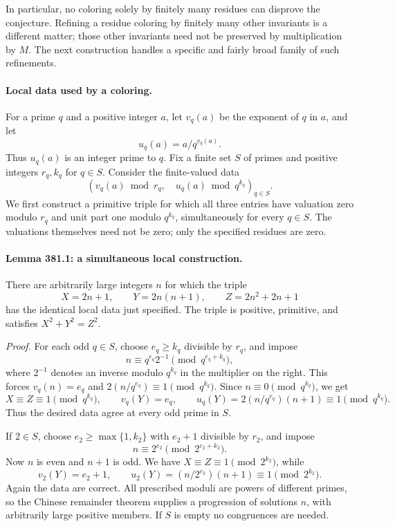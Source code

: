 \documentclass[11pt]{article}
\begin{document}
In particular, no coloring solely by finitely many residues can disprove the conjecture. Refining a residue coloring by finitely many other invariants is a different matter; those other invariants need not be preserved by multiplication by $M$. The next construction handles a specific and fairly broad family of such refinements.

\paragraph{Local data used by a coloring.}
For a prime $q$ and a positive integer $a$, let $v_q(a)$ be the exponent of $q$ in $a$, and let
\[
                        u_q(a)=a/q^{v_q(a)}.
\]
Thus $u_q(a)$ is an integer prime to $q$. Fix a finite set $S$ of primes and positive integers $r_q,k_q$ for $q\in S$. Consider the finite-valued data
\begin{equation}\label{a381:localdata}
 \left(v_q(a)\bmod r_q,\quad u_q(a)\bmod q^{k_q}\right)_{q\in S}.
\end{equation}
We first construct a primitive triple for which all three entries have valuation zero modulo $r_q$ and unit part one modulo $q^{k_q}$, simultaneously for every $q\in S$. The valuations themselves need not be zero; only the specified residues are zero.

\paragraph{Lemma 381.1: a simultaneous local construction.}
There are arbitrarily large integers $n$ for which the triple
\begin{equation}\label{a381:consecutive}
        X=2n+1,\qquad Y=2n(n+1),\qquad Z=2n^2+2n+1
\end{equation}
has the identical local data just specified. The triple is positive, primitive, and satisfies $X^2+Y^2=Z^2$.

\emph{Proof.} For each odd $q\in S$, choose $e_q\geq k_q$ divisible by $r_q$, and impose
\[
                  n\equiv q^{e_q}2^{-1}\pmod{q^{e_q+k_q}},
\]
where $2^{-1}$ denotes an inverse modulo $q^{k_q}$ in the multiplier on the right. This forces $v_q(n)=e_q$ and $2(n/q^{e_q})\equiv1\pmod{q^{k_q}}$. Since $n\equiv0\pmod{q^{k_q}}$, we get
\[
 X\equiv Z\equiv1\pmod{q^{k_q}},\qquad
 v_q(Y)=e_q,\qquad
 u_q(Y)=2(n/q^{e_q})(n+1)\equiv1\pmod{q^{k_q}}.
\]
Thus the desired data agree at every odd prime in $S$.

If $2\in S$, choose $e_2\geq\max\{1,k_2\}$ with $e_2+1$ divisible by $r_2$, and impose
\[
                       n\equiv2^{e_2}\pmod{2^{e_2+k_2}}.
\]
Now $n$ is even and $n+1$ is odd. We have $X\equiv Z\equiv1\pmod{2^{k_2}}$, while
\[
 v_2(Y)=e_2+1,\qquad
 u_2(Y)=(n/2^{e_2})(n+1)\equiv1\pmod{2^{k_2}}.
\]
Again the data are correct. All prescribed moduli are powers of different primes, so the Chinese remainder theorem supplies a progression of solutions $n$, with arbitrarily large positive members. If $S$ is empty no congruences are needed.
\end{document}
